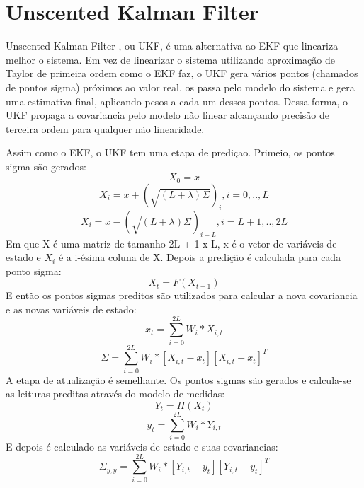 \documentclass[
	12pt,				%
	openright,			%
	twoside,			%
	convert,
	a4paper,			%
	english,			%
	french,				%
	spanish,			%
	brazil				%
	]{abntex2}
\begin{document}
\section{Unscented Kalman Filter}
Unscented Kalman Filter \cite{wan2000unscented}, ou UKF, é uma alternativa ao EKF que lineariza melhor o sistema. Em vez de linearizar o sistema utilizando aproximação de Taylor de primeira ordem como o EKF faz, o UKF gera vários pontos (chamados de pontos sigma) próximos ao valor real, os passa pelo modelo do sistema e gera uma estimativa final, aplicando pesos a cada um desses pontos. Dessa forma, o UKF propaga a covariancia pelo modelo não linear alcançando precisão de terceira ordem para qualquer não linearidade.
\par
Assim como o EKF, o UKF tem uma etapa de prediçao. Primeio, os pontos sigma são gerados:
\begin{equation}
	X_{0} = x
\end{equation}
\begin{equation}
	X_{i} = x + (\sqrt{(L + \lambda) \Sigma})_i, i = 0,..,L
\end{equation}
\begin{equation}
	X_{i} = x - (\sqrt{(L + \lambda) \Sigma})_{i - L}, i = L + 1,.., 2L
\end{equation}
Em que X é uma matriz de tamanho 2L + 1 x L, x é o vetor de variáveis de estado e $X_i$ é a i-ésima coluna de X.
Depois a predição é calculada para cada ponto sigma:
\begin{equation}
	X_t = F(X_{t-1})
\end{equation}
E então os pontos sigmas preditos são utilizados para calcular a nova covariancia e as novas variáveis de estado:
\begin{equation}
	x_t = \sum\limits_{i=0}^{2L} W_i* X_{i, t}
\end{equation}
\begin{equation}
	\Sigma = \sum\limits_{i=0}^{2L} W_i * [X_{i, t} - x_t] [X_{i, t} - x_t]^T
\end{equation}
A etapa de atualização é semelhante. Os pontos sigmas são gerados e calcula-se as leituras preditas através do modelo de medidas:
\begin{equation}
	Y_t = H(X_t)
\end{equation}
\begin{equation}
	y_t = \sum\limits_{i=0}^{2L} W_i* Y_{i, t}
\end{equation}
E depois é calculado as variáveis de estado e suas covariancias:
\begin{equation}
	\Sigma_{y,y} = \sum\limits_{i=0}^{2L} W_i * [Y_{i, t} - y_t] [Y_{i, t} - y_t]^T
\end{equation}
\end{document}
